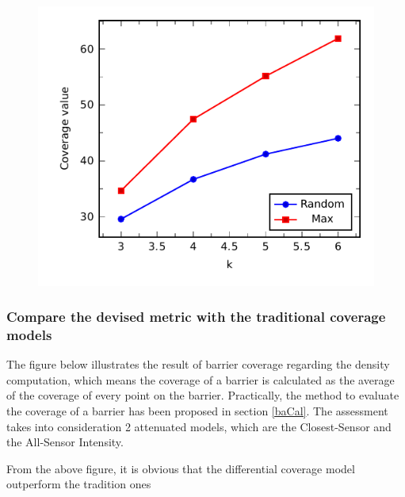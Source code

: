 \begin{figure}[h]
	\centering
	\includegraphics[scale=1.]{Hinhanh/kEffect/main.pdf}
	\caption{}
	\label{fig:}
\end{figure}

\subsubsection{Compare the devised metric with the traditional coverage models}
The figure below illustrates the result of barrier coverage regarding the density computation, which means the coverage of a barrier is calculated as the average of the coverage of every point on the barrier. Practically, the method to evaluate the coverage of a barrier has been proposed in section \ref{baCal}. The assessment takes into consideration 2 attenuated models, which are the Closest-Sensor and the All-Sensor Intensity.

From the above figure, it is obvious that the differential coverage model outperform the tradition ones
